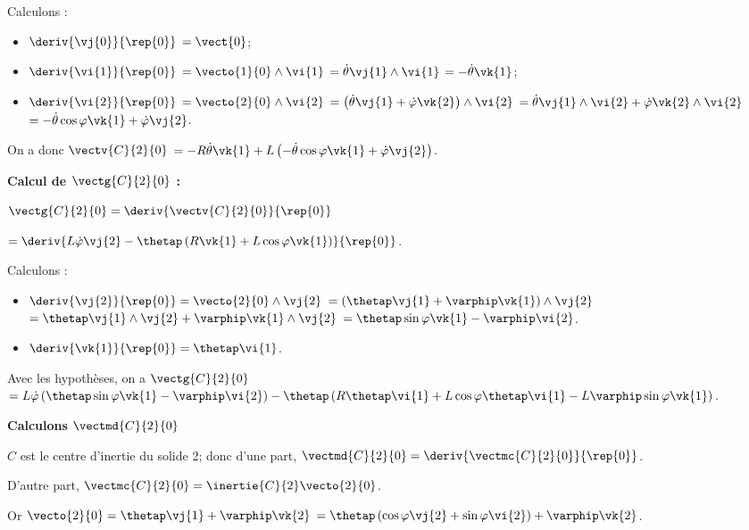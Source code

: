 Calculons : 
\begin{itemize}
\item $\deriv{\vj{0}}{\rep{0}}$ $=\vect{0}$;
\item $\deriv{\vi{1}}{\rep{0}}$ $=\vecto{1}{0} \wedge \vi{1}$ $=\dot{\theta}\vj{1} \wedge \vi{1}$ $=-\dot{\theta}\vk{1}$;
\item $\deriv{\vi{2}}{\rep{0}}$ $=\vecto{2}{0} \wedge \vi{2}$ 
$=\left(\dot{\theta}\vj{1} + \dot{\varphi}\vk{2}\right)\wedge \vi{2}$
$=\dot{\theta}\vj{1}\wedge \vi{2} + \dot{\varphi}\vk{2}\wedge \vi{2}$
$=-\dot{\theta}\cos\varphi\vk{1} + \dot{\varphi}\vj{2}$.
\end{itemize}

On a donc 
$\vectv{C}{2}{0}$ 
$= -R\dot{\theta}\vk{1}+L\left(-\dot{\theta}\cos\varphi\vk{1} + \dot{\varphi}\vj{2}\right)$.

\textbf{Calcul de $\vectg{C}{2}{0}$ : }  

$\vectg{C}{2}{0} =\deriv{\vectv{C}{2}{0}}{\rep{0}}$

$ =\deriv{ L\dot{\varphi}\vj{2}-\thetap\left( R\vk{1}+L\cos\varphi\vk{1}\right)}{\rep{0}} $.

Calculons :
\begin{itemize}
\item $\deriv{\vj{2}}{\rep{0}}=\vecto{2}{0}\wedge\vj{2}$ 
$=\left(\thetap\vj{1}+\varphip\vk{1} \right)\wedge\vj{2}$ 
$=\thetap\vj{1}\wedge\vj{2}+\varphip\vk{1} \wedge\vj{2}$
$=\thetap\sin\varphi\vk{1}-\varphip\vi{2} $.
\item $\deriv{\vk{1}}{\rep{0}} = \thetap\vi{1}$.
\end{itemize}


Avec les hypothèses, on a $\vectg{C}{2}{0} $
$ =L\dot{\varphi}\left(\thetap\sin\varphi\vk{1}-\varphip\vi{2}\right)
-\thetap\left( R \thetap\vi{1} +L\cos\varphi \thetap\vi{1}
-L\varphip\sin\varphi\vk{1}\right)
$.



\vspace{.5cm}

\textbf{Calculons $\vectmd{C}{2}{0}$}

$C$ est le centre d'inertie du solide 2; donc 
d'une part, $\vectmd{C}{2}{0} = \deriv{\vectmc{C}{2}{0} }{\rep{0}}$.

 D'autre part, $\vectmc{C}{2}{0} = \inertie{C}{2}\vecto{2}{0}$. 
 
 Or $\vecto{2}{0} = \thetap \vj{1} + \varphip\vk{2}$ $= \thetap \left(\cos\varphi \vj{2} + \sin\varphi \vi{2}\right) + \varphip\vk{2}$.
 
